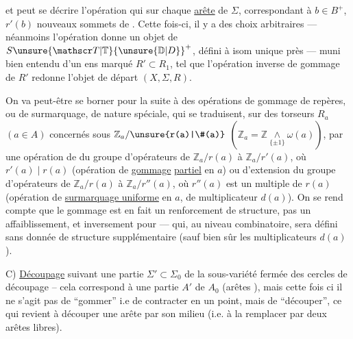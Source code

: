 
et peut se décrire   l'opération qui sur chaque \uline{arête}   de $\Sigma$, correspondant à  $b\in B^+$, $r'(b)$ nouveaux sommets de  . Cette fois-ci,  il y a des choix arbitraires --- néanmoins l'opération donne un objet de $S\unsure{\mathscr T|\mathbb T}{\unsure{\mathbb D|D}}^{+}$, défini à isom unique près  --- muni bien entendu d'un ens marqué $R'\subset R_1$, tel que l'opération inverse de gommage de $R'$ redonne l'objet de départ $(X,\Sigma,R)$.


On va peut-être se borner pour la suite à des opérations de gommage de repères, ou de surmarquage, de nature spéciale, qui se traduisent, sur  des torseurs $R_a$ $(a\in A)$ concernés sous $\mathbb Z_a/\unsure{r(a)|\#(a)}$  $(\mathbb Z_a=\mathbb Z\mathbin{\underset{\{\pm1\}}{\wedge}}\omega(a))$, par une opération de  du groupe d'opérateurs de $\mathbb Z_a/r(a)$ à $\mathbb Z_a/r'(a)$, où $r'(a)\mid r(a)$ (opération de \uline{gommage} \uline{partiel}  en $a$) ou d'extension du groupe d'opérateurs de $\mathbb Z_a/r(a)$ à $\mathbb Z_a/r''(a)$, où $r''(a)$  est un multiple de $r(a)$ (opération de \uline{surmarquage uniforme} en $a$, \deleted{\unsure{)}} de multiplicateur $d(a)$). On se rend compte  que le gommage  est en fait un renforcement de structure, pas un affaiblissement, et inversement pour  --- qui, au niveau combinatoire, sera défini sans donnée de structure supplémentaire (sauf bien sûr les multiplicateurs $d(a)$).


C) \uline{Découpage}  suivant une partie  $\Sigma'\subset\Sigma_0$ de la sous-variété fermée des cercles de découpage -- cela correspond à une partie $A'$ de $A_0$ (arêtes ), mais cette fois ci il ne s'agit pas de ``gommer'' i.e de contracter en un point, mais de ``découper'', ce qui  revient à découper une arête par son milieu (i.e. à la remplacer par deux arêtes libres).

